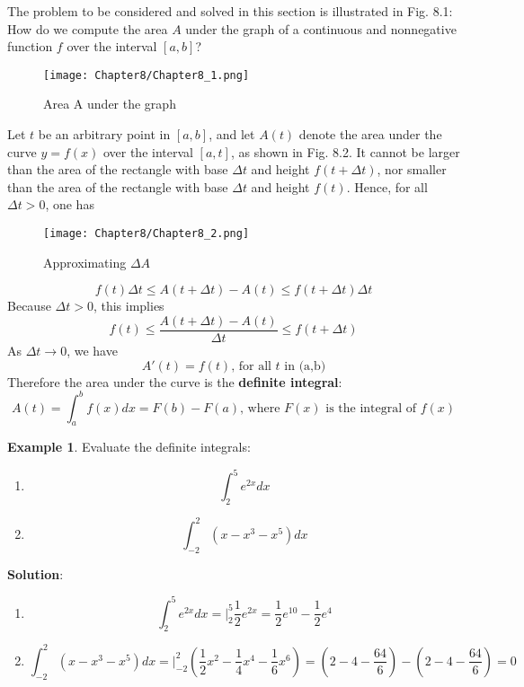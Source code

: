 \documentclass[10pt,a4paper]{book}
\theoremstyle{definition}\newtheorem{definition}{Definition}
\theoremstyle{definition}\newtheorem{fact}{Fact}
\theoremstyle{definition}\newtheorem{ex}{Ex.}
\theoremstyle{definition}\newtheorem{project}{Project}
\theoremstyle{definition}\newtheorem{problem}{Problem}
\theoremstyle{definition}\newtheorem{example}{Example}
\numberwithin{theorem}{chapter}
\numberwithin{corollary}{chapter}
\numberwithin{assumption}{chapter}
\numberwithin{definition}{chapter}
\numberwithin{prop}{chapter}
\numberwithin{notation}{chapter}
\numberwithin{problem}{chapter}
\numberwithin{example}{chapter}
\numberwithin{fact}{chapter}
\numberwithin{ex}{chapter}
\begin{document}
	The problem to be considered and solved in this section is illustrated in Fig. 8.1: How do we compute the area $A$ under the graph of a continuous and nonnegative function $f$ over the interval $[a, b]$?
	
	\begin{figure}[H]
		\centering
		\texttt{[image: Chapter8/Chapter8\_1.png]}
		\caption{Area A under the graph}
	\end{figure}
	
	Let $t$ be an arbitrary point in $[a, b]$, and let $A(t)$ denote the area under the curve $y = f (x)$ over the interval $[a, t]$, as shown in Fig. 8.2. It cannot be larger than the area of the rectangle with base $\Delta t$ and height $f (t + \Delta t)$, nor smaller than the area of the rectangle with base $\Delta t$ and height $f (t)$. Hence, for all $\Delta t > 0$, one has
	\begin{figure}[H]
		\centering
		\texttt{[image: Chapter8/Chapter8\_2.png]}
		\caption{Approximating $\Delta A$}
	\end{figure}
	$$f(t)\Delta t \leq A(t+\Delta t) - A(t) \leq f(t+\Delta t)\Delta t$$
	Because $\Delta t > 0$, this implies
	$$f(t) \leq \frac{A(t+\Delta t)-A(t)}{\Delta t} \leq f(t+\Delta t) $$
	As $\Delta t \rightarrow 0$, we have
	$$A'(t) = f(t) \text{,   for all $t$ in (a,b)} $$
	Therefore the area under the curve is the \textbf{definite integral}:
	$$ A(t) = \int_a^b f(x) dx = F(b) - F(a) \text{, where $F(x)$ is the integral of $f(x)$}$$
	
	\begin{example}
		Evaluate the definite integrals:
		\begin{enumerate}[label=(\alph*)]
			\item $$\int_2^5 e^{2x}dx $$
			\item $$\int_{-2}^2 (x-x^3-x^5)dx $$
		\end{enumerate}
		\textbf{Solution}:
		\begin{enumerate}[label=(\alph*)]
			\item $$\int_2^5 e^{2x} dx = \bigg |_2^5 \frac{1}{2}e^{2x} = \frac{1}{2}e^{10} - \frac{1}{2}e^4 $$
			\item $$\int_{-2}^2 (x-x^3-x^5)dx = \bigg |_{-2}^2 (\frac{1}{2}x^2-\frac{1}{4}x^4-\frac{1}{6}x^6) = (2-4-\frac{64}{6}) - (2-4-\frac{64}{6})=0$$
		\end{enumerate}
	\end{example}
	
\end{document}
